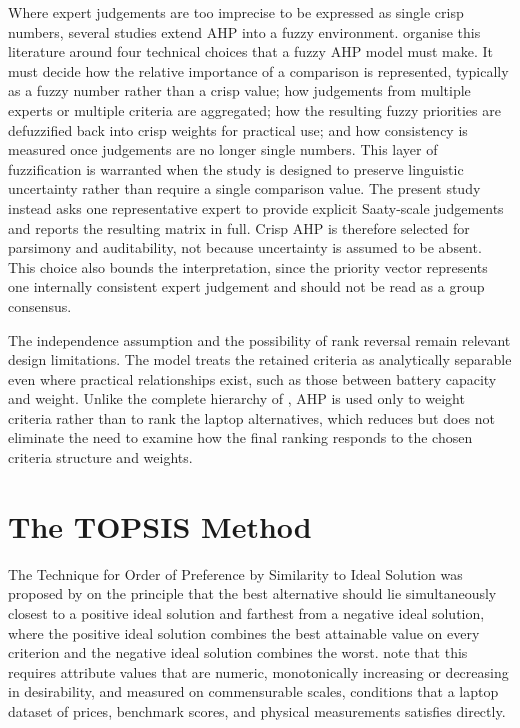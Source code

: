 Where expert judgements are too imprecise to be expressed as single crisp numbers, several studies
extend AHP into a fuzzy environment. \textcite{liu_review_2020} organise this literature around
four technical choices that a fuzzy AHP model must make. It must decide how the relative
importance of a comparison is represented, typically as a fuzzy number rather than a crisp value;
how judgements from multiple experts or multiple criteria are aggregated; how the resulting fuzzy
priorities are defuzzified back into crisp weights for practical use; and how consistency is
measured once judgements are no longer single numbers. This layer of fuzzification is warranted when the study
is designed to preserve linguistic uncertainty rather than require a single comparison value. The
present study instead asks one representative expert to provide explicit Saaty-scale judgements
and reports the resulting matrix in full. Crisp AHP is therefore selected for parsimony and
auditability, not because uncertainty is assumed to be absent. This choice also bounds the
interpretation, since the priority vector represents one internally consistent expert judgement
and should not be read as a group consensus.

The independence assumption and the possibility of rank reversal remain relevant design
limitations. The model treats the retained criteria as analytically separable even where practical
relationships exist, such as those between battery capacity and weight. Unlike the complete
hierarchy of , AHP is used only to weight
criteria rather than to rank the laptop alternatives, which reduces but does not eliminate the
need to examine how the final ranking responds to the chosen criteria structure and weights.

\section{The TOPSIS Method}\label{sec:topsis-theory}

The Technique for Order of Preference by Similarity to Ideal Solution was proposed by
\textcite{Hwang1981MultipleAD} on the principle that the best alternative should lie
simultaneously closest to a positive ideal solution and farthest from a negative ideal solution,
where the positive ideal solution combines the best attainable value on every criterion and the
negative ideal solution combines the worst. \textcite{behzadian_state--art_2012} note that this
requires attribute values that are numeric, monotonically increasing or decreasing in desirability,
and measured on commensurable scales, conditions that a laptop dataset of prices, benchmark scores,
and physical measurements satisfies directly.

